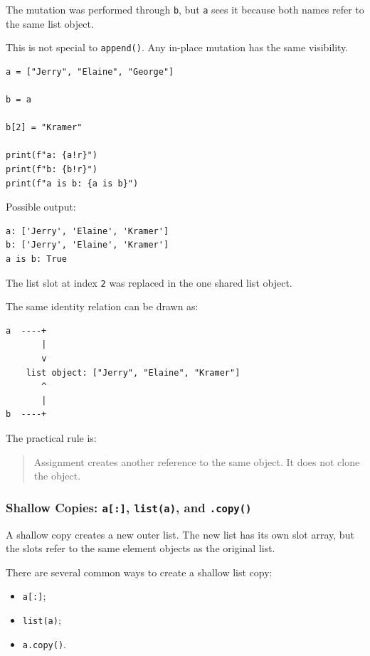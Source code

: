 The mutation was performed through \texttt{b}, but \texttt{a} sees it because both names refer to the same list object.

This is not special to \texttt{append()}. Any in-place mutation has the same visibility.

\begin{verbatim}
a = ["Jerry", "Elaine", "George"]

b = a

b[2] = "Kramer"

print(f"a: {a!r}")
print(f"b: {b!r}")
print(f"a is b: {a is b}")
\end{verbatim}

Possible output:

\begin{verbatim}
a: ['Jerry', 'Elaine', 'Kramer']
b: ['Jerry', 'Elaine', 'Kramer']
a is b: True
\end{verbatim}

The list slot at index \texttt{2} was replaced in the one shared list object.

The same identity relation can be drawn as:

\begin{verbatim}
a  ----+
       |
       v
    list object: ["Jerry", "Elaine", "Kramer"]
       ^
       |
b  ----+
\end{verbatim}

The practical rule is:

\begin{quote}
Assignment creates another reference to the same object. It does not clone the object.
\end{quote}

\subsubsection{Shallow Copies: \texttt{a[:]}, \texttt{list(a)}, and \texttt{.copy()}}

A shallow copy creates a new outer list. The new list has its own slot array, but the slots refer to the same element objects as the original list.

There are several common ways to create a shallow list copy:

\begin{itemize}
    \item \texttt{a[:]};
    \item \texttt{list(a)};
    \item \texttt{a.copy()}.
\end{itemize}

